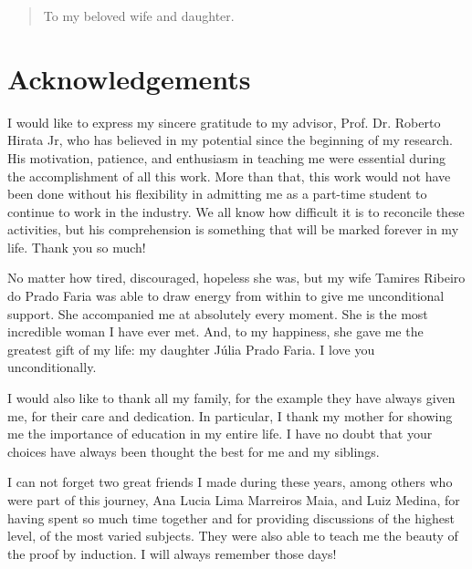 \documentclass[11pt,twoside,a4paper]{book}
\theoremstyle{plain}
\theoremstyle{definition}
\newenvironment{dedication}
     {\vspace{6ex}\begin{quotation}\begin{center}\begin{em}}
     {\par\end{em}\end{center}\end{quotation}}
\begin{document}

\begin{dedication}
To my beloved wife and daughter.
\end{dedication}


\chapter*{Acknowledgements}
I would like to express my sincere gratitude to my advisor, Prof. Dr. Roberto Hirata Jr, who has believed in my potential since the beginning of my research. His motivation, patience, and enthusiasm in teaching me were essential during the accomplishment of all this work. More than that, this work would not have been done without his flexibility in admitting me as a part-time student to continue to work in the industry. We all know how difficult it is to reconcile these activities, but his comprehension is something that will be marked forever in my life. Thank you so much!

No matter how tired, discouraged, hopeless she was, but my wife Tamires Ribeiro do Prado Faria was able to draw energy from within to give me unconditional support. She accompanied me at absolutely every moment. She is the most incredible woman I have ever met. And, to my happiness, she gave me the greatest gift of my life: my daughter Júlia Prado Faria. I love you unconditionally.

I would also like to thank all my family, for the example they have always given me, for their care and dedication. In particular, I thank my mother for showing me the importance of education in my entire life. I have no doubt that your choices have always been thought the best for me and my siblings.

I can not forget two great friends I made during these years, among others who were part of this journey, Ana Lucia Lima Marreiros Maia, and Luiz Medina, for having spent so much time together and for providing discussions of the highest level, of the most varied subjects. They were also able to teach me the beauty of the proof by induction. I will always remember those days!
\end{document}
